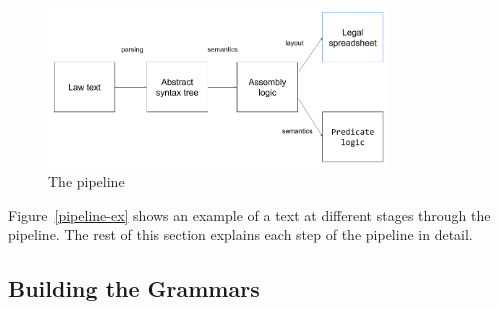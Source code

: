 \documentclass{IOS-Book-Article}
\begin{document}
\begin{figure}
    \includegraphics[width=0.8\textwidth]{pipeline.png}
\caption{The pipeline}
\label{pipeline}
\end{figure}

Figure~\ref{pipeline-ex} shows an example of a text at different stages through the pipeline. The rest of this section explains each step of the pipeline in detail.



\subsection{Building the Grammars}
\end{document}
